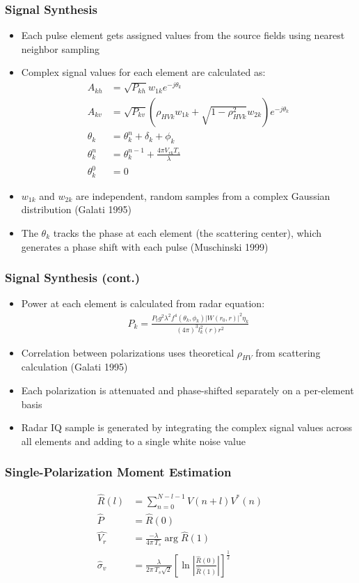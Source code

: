 \documentclass[red]{beamer}
\begin{document}
\begin{frame}[<+->]
	\frametitle{Signal Synthesis}
	\begin{itemize}
		\item Each pulse element gets assigned values from the source fields using 
		nearest neighbor sampling
		\item Complex signal values for each element are calculated as:
		\begin{align}
			A_{kh} &= \sqrt{P_{kh}} w_{1k} e^{-j\theta_k} \\
	A_{kv} &= \sqrt{P_{kv}} \left(\rho_{HVk} w_{1k} + \sqrt{1 - \rho_{HVk}^2} w_{2k} \right) e^{-j\theta_k} \\
    \theta_k &= \theta^n_k + \delta_k + \phi_k\\
    \theta^n_k &= \theta^{n-1}_k + \frac{4 \pi V_{rk} T_s}{\lambda}\\
    \theta^0_k &= 0
    \end{align}
		\item $w_{1k}$ and $w_{2k}$ are independent, random samples from a complex Gaussian distribution (Galati 1995)
		\item The $\theta_k$ tracks the phase at each element (the scattering center), which generates a phase shift with each pulse (Muschinski 1999)
	\end{itemize}
\end{frame}

\begin{frame}[<+->]
	\frametitle{Signal Synthesis (cont.)}
		\begin{itemize}
		\item Power at each element is calculated from radar equation:
		\begin{align}
		    P_k = \frac{P_t g^2 \lambda^2 f^4(\theta_k,\phi_k) |W(r_0, r)|^2 \eta_k}
		        {(4 \pi)^3 l_k^2(r) r^2}
		\end{align}
		\item Correlation between polarizations uses theoretical $\rho_{HV}$ from scattering calculation (Galati 1995)
		\item Each polarization is attenuated and phase-shifted separately on a per-element basis
		\item Radar IQ sample is generated by integrating the complex signal
		values across all elements and adding to a single white noise value
	\end{itemize}
\end{frame}

\begin{frame}
	\frametitle{Single-Polarization Moment Estimation}
	\begin{align}
	    \hat{R}(l) &= \sum_{n=0}^{N-l-1} V(n + l) V^*(n) \\
	    \hat{P} &= \hat{R}(0) \\
	    \hat{V_r} &= \frac{-\lambda}{4 \pi \,T_s} \arg{\hat{R}(1)} \\
	    \hat{\sigma}_v &= \frac{\lambda}{2 \pi \,T_s \sqrt{2}}
	        \left[\ln{\left|\frac{\hat{R}(0)}{\hat{R}(1)}\right|}\right]^{\frac{1}{2}}
	\end{align}
\end{frame}
\end{document}
